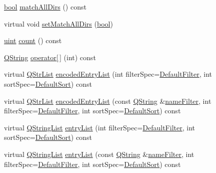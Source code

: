 \begin{DoxyCompactItemize}
\item 
\hyperlink{qglobal_8h_a1062901a7428fdd9c7f180f5e01ea056}{bool} \hyperlink{class_q_dir_a398803de11f488f7a8b748b953d73d18}{match\+All\+Dirs} () const 
\item 
virtual void \hyperlink{class_q_dir_aec96bf79103196eefd2a38ff74aeadd0}{set\+Match\+All\+Dirs} (\hyperlink{qglobal_8h_a1062901a7428fdd9c7f180f5e01ea056}{bool})
\item 
\hyperlink{qglobal_8h_a4d3943ddea65db7163a58e6c7e8df95a}{uint} \hyperlink{class_q_dir_ac48855e1aead59d7b6cc5752f12d0556}{count} () const 
\item 
\hyperlink{class_q_string}{Q\+String} \hyperlink{class_q_dir_a3fc0548fca3c4e761622a71b343c98a7}{operator\mbox{[}$\,$\mbox{]}} (int) const 
\item 
virtual \hyperlink{class_q_str_list}{Q\+Str\+List} \hyperlink{class_q_dir_a4b7889f91d79b5547cbef1c2bc6724e1}{encoded\+Entry\+List} (int filter\+Spec=\hyperlink{class_q_dir_a8b8c5b4f0028081f094c85129b8cc8b1a592073bc83aaadb4120fb7a9fdf1016c}{Default\+Filter}, int sort\+Spec=\hyperlink{class_q_dir_a428a858abe9593efc498b6641b41994ca34834a05408264ddaae5f0259fb79038}{Default\+Sort}) const 
\item 
virtual \hyperlink{class_q_str_list}{Q\+Str\+List} \hyperlink{class_q_dir_a2ce2dc8f717796ede60cea70c1363575}{encoded\+Entry\+List} (const \hyperlink{class_q_string}{Q\+String} \&\hyperlink{class_q_dir_a8d501954ccb9e48d8e675c85c60ec57a}{name\+Filter}, int filter\+Spec=\hyperlink{class_q_dir_a8b8c5b4f0028081f094c85129b8cc8b1a592073bc83aaadb4120fb7a9fdf1016c}{Default\+Filter}, int sort\+Spec=\hyperlink{class_q_dir_a428a858abe9593efc498b6641b41994ca34834a05408264ddaae5f0259fb79038}{Default\+Sort}) const 
\item 
virtual \hyperlink{class_q_string_list}{Q\+String\+List} \hyperlink{class_q_dir_a468530017006c1eeea94c78d264964aa}{entry\+List} (int filter\+Spec=\hyperlink{class_q_dir_a8b8c5b4f0028081f094c85129b8cc8b1a592073bc83aaadb4120fb7a9fdf1016c}{Default\+Filter}, int sort\+Spec=\hyperlink{class_q_dir_a428a858abe9593efc498b6641b41994ca34834a05408264ddaae5f0259fb79038}{Default\+Sort}) const 
\item 
virtual \hyperlink{class_q_string_list}{Q\+String\+List} \hyperlink{class_q_dir_afd821ad3e452d9a07a4027276b4297ba}{entry\+List} (const \hyperlink{class_q_string}{Q\+String} \&\hyperlink{class_q_dir_a8d501954ccb9e48d8e675c85c60ec57a}{name\+Filter}, int filter\+Spec=\hyperlink{class_q_dir_a8b8c5b4f0028081f094c85129b8cc8b1a592073bc83aaadb4120fb7a9fdf1016c}{Default\+Filter}, int sort\+Spec=\hyperlink{class_q_dir_a428a858abe9593efc498b6641b41994ca34834a05408264ddaae5f0259fb79038}{Default\+Sort}) const 

\end{DoxyCompactItemize}
